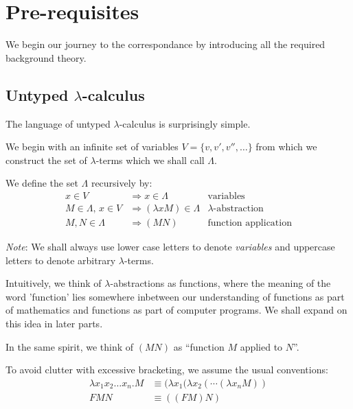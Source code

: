 \chapter{Pre-requisites}

We begin our journey to the correspondance by introducing all the required
background theory.


\section{Untyped $\lambda$-calculus}


The language of untyped $\lambda$-calculus is surprisingly simple.

We begin with an infinite set of variables $V = \{v, v', v'', \ldots\}$ from
which we construct the set of $\lambda$-terms which we shall call $\Lambda$.

We define the set $\Lambda$ recursively by:
\begin{align*}
    x \in V & \Rightarrow x \in \Lambda &
        \text{variables} \\
    M \in \Lambda,\, x \in V & \Rightarrow (\lambda x M) \in \Lambda &
        \text{$\lambda$-abstraction} \\
    M, N \in \Lambda & \Rightarrow (M N) &
        \text{function application}
\end{align*}

\emph{Note}: We shall always use lower case letters to denote \emph{variables} and
uppercase letters to denote arbitrary $\lambda$-terms.

Intuitively, we think of $\lambda$-abstractions as functions, where the meaning
of the word 'function' lies somewhere inbetween our understanding of functions as
part of mathematics and functions as part of computer programs. We shall expand
on this idea in later parts.

In the same spirit, we think of $(M N)$ as ``function $M$ applied to $N$''.

To avoid clutter with excessive bracketing, we assume the usual conventions:
\begin{align*}
    \lambda x_1 x_2 \ldots x_n . M &\equiv
        (\lambda x_1 (\lambda x_2 (\cdots (\lambda x_n M)) \\
    F M N &\equiv ((FM)N)
\end{align*}

